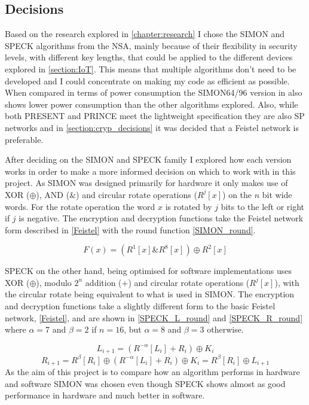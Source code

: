 \documentclass[12pt,twoside,a4paper]{report}
\begin{document}
    \subsection{Decisions}
    Based on the research explored in \autoref{chapter:research} I chose the SIMON and SPECK algorithms from the NSA, mainly because of their flexibility in security levels, with different key lengths, that could be applied to the different devices explored in \autoref{section:IoT}. This means that multiple algorithms don't need to be developed and I could concentrate on making my code as efficient as possible. When compared in terms of power consumption the SIMON64/96 version in \cite{Banik2015} also shows lower power consumption than the other algorithms explored. Also, while both PRESENT and PRINCE meet the lightweight specification they are also SP networks and in \autoref{section:cryp_decisions} it was decided that a Feistel network is preferable.
    
    After deciding on the SIMON and SPECK family I explored how each version works in order to make a more informed decision on which to work with in this project. As SIMON was designed primarily for hardware it only makes use of XOR ($\oplus$), AND ($\&$) and circular rotate operations ($R^j[x]$) on the $n$ bit wide words. For the rotate operation the word $x$ is rotated by $j$ bits to the left or right if $j$ is negative. The encryption and decryption functions take the Feistel network form described in \autoref{Feistel} with the round function \autoref{SIMON_round}.
    
    \begin{equation}
    \label{SIMON_round}
    F(x) = (R^1[x]\&R^8[x]) \oplus R^2[x]
    \end{equation}
    
    SPECK on the other hand, being optimised for software implementations uses XOR ($\oplus$), modulo $2^n$ addition ($+$) and circular rotate operations ($R^j[x]$), with the circular rotate being equivalent to what is used in SIMON. The encryption and decryption functions take a slightly different form to the basic Feistel network, \autoref{Feistel}, and are shown in \autoref{SPECK_L_round} and \ref{SPECK_R_round} where $\alpha = 7$ and $\beta = 2$ if $n = 16$, but $\alpha = 8$ and $\beta = 3$ otherwise.
    
    \begin{equation}
    \label{SPECK_L_round}
    L_{i+1} = (R^{-\alpha}[L_i] + R_i) \oplus K_i
    \end{equation}
    \begin{equation}
    \label{SPECK_R_round}
    R_{i+1} = R^{\beta}[R_i] \oplus (R^{-\alpha}[L_i] + R_i) \oplus K_i = R^{\beta}[R_i] \oplus L_{i+1}
    \end{equation}
    As the aim of this project is to compare how an algorithm performs in hardware and software SIMON was chosen even though SPECK shows almost as good performance in hardware and much better in software. 
    
\end{document}
